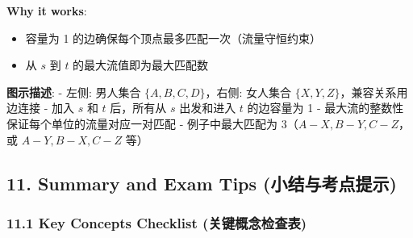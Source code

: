 \documentclass[10pt,a4paper,openany]{ctexbook}
\theoremstyle{definition}
\theoremstyle{remark}
\renewenvironment{quote}
  {\list{}{\leftmargin=1em\rightmargin=0pt\topsep=0.5pt\partopsep=0pt}\item[]}
  {\endlist}
\begin{document}
\textbf{Why it works}:
\begin{itemize}
\item 容量为 1 的边确保每个顶点最多匹配一次（流量守恒约束）
\item 从 $s$ 到 $t$ 的最大流值即为最大匹配数

\end{itemize}

\begin{quote}
\textbf{图示描述}:
- 左侧: 男人集合 $\{A, B, C, D\}$，右侧: 女人集合 $\{X, Y, Z\}$，兼容关系用边连接
- 加入 $s$ 和 $t$ 后，所有从 $s$ 出发和进入 $t$ 的边容量为 1
- 最大流的整数性保证每个单位的流量对应一对匹配
- 例子中最大匹配为 3（$A-X, B-Y, C-Z$，或 $A-Y, B-X, C-Z$ 等）

\end{quote}
\vspace{-2pt}

\subsection{11. Summary and Exam Tips (小结与考点提示)}

\subsubsection{11.1 Key Concepts Checklist (关键概念检查表)}
\end{document}

